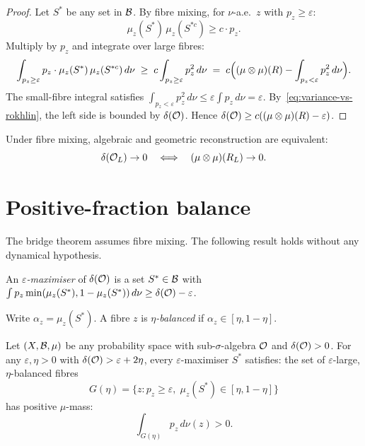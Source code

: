\begin{proof}
Let $S^*$ be any set in $\mathcal{B}$.  By fibre mixing, for $\nu$-a.e.\
$z$ with $p_z \geq \varepsilon$:
\[
  \mu_z(S^*)\,\mu_z(S^{*c}) \geq c \cdot p_z.
\]
Multiply by $p_z$ and integrate over large fibres:
\[
  \int_{p_z \geq \varepsilon} p_z \cdot
    \mu_z(S^*)\,\mu_z(S^{*c})\,d\nu
  \;\geq\; c \int_{p_z \geq \varepsilon} p_z^2\,d\nu
  \;=\; c\Bigl((\mu \otimes \mu)(R) -
    \int_{p_z < \varepsilon} p_z^2\,d\nu\Bigr).
\]
The small-fibre integral satisfies
$\int_{p_z < \varepsilon} p_z^2\,d\nu \leq
\varepsilon \int p_z\,d\nu = \varepsilon$.
By~\eqref{eq:variance-vs-rokhlin}, the left side is bounded
by $\delta(\mathcal{O})$.  Hence
$\delta(\mathcal{O}) \geq c((\mu \otimes \mu)(R) - \varepsilon)$.
\end{proof}

\begin{corollary}[Bridge]
\label{cor:bridge}
Under fibre mixing, algebraic and geometric reconstruction are
equivalent:
\[
  \delta(\mathcal{O}_L) \to 0
  \quad\Longleftrightarrow\quad
  (\mu \otimes \mu)(R_L) \to 0.
\]
\end{corollary}

\section{Positive-fraction balance}
\label{sec:positive}

The bridge theorem assumes fibre mixing.  The following result
holds without any dynamical hypothesis.

\begin{definition}
An \emph{$\varepsilon$-maximiser} of $\delta(\mathcal{O})$ is a set
$S^* \in \mathcal{B}$ with
$\int p_z \min(\mu_z(S^*), 1 - \mu_z(S^*))\,d\nu \geq \delta(\mathcal{O}) - \varepsilon$.

Write $\alpha_z = \mu_z(S^*)$.  A fibre $z$ is
\emph{$\eta$-balanced} if $\alpha_z \in [\eta, 1 - \eta]$.
\end{definition}

\begin{theorem}
\label{thm:positive-fraction}
Let $(X, \mathcal{B}, \mu)$ be any probability space with
sub-$\sigma$-algebra $\mathcal{O}$ and $\delta(\mathcal{O}) > 0$.  For any
$\varepsilon, \eta > 0$ with $\delta(\mathcal{O}) > \varepsilon + 2\eta$,
every $\varepsilon$-maximiser $S^*$ satisfies: the set of
$\varepsilon$-large, $\eta$-balanced fibres
\[
  G(\eta) = \{z : p_z \geq \varepsilon,\;
    \mu_z(S^*) \in [\eta, 1 - \eta]\}
\]
has positive $\mu$-mass:
\begin{equation}\label{eq:positive-fraction}
  \int_{G(\eta)} p_z\,d\nu(z) > 0.
\end{equation}
\end{theorem}

